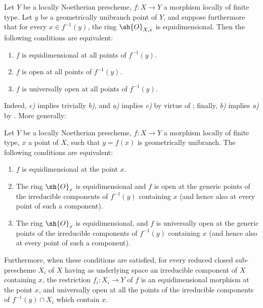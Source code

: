 \begin{corollary}[14.4.6]
\label{IV.14.4.6}
Let $Y$ be a locally Noetherian prescheme, $f:X\to Y$ a morphism locally of finite type.
Let $y$ be a geometrically unibranch point of $Y$, and suppose furthermore that for every $x\in f^{-1}(y)$, the ring $\sh{O}_{X,x}$ is equidimensional.
Then the following conditions are equivalent:
\begin{enumerate}[label=\emph{\alph*)}]
  \item $f$ is equidimensional  at all points of $f^{-1}(y)$.
  \item $f$ is open at all points of $f^{-1}(y)$.
  \item $f$ is universally open at all points of $f^{-1}(y)$.
\end{enumerate}
\end{corollary}

Indeed, \emph{c)} implies trivially \emph{b)}, and \emph{a)} implies \emph{c)} by virtue of ; finally, \emph{b)} implies \emph{a)} by .
More generally:

\begin{proposition}[14.4.7]
\label{IV.14.4.7}
Let $Y$ be a locally Noetherian prescheme, $f:X\to Y$ a morphism locally of finite type, $x$ a point of $X$, such that $y=f(x)$ is geometrically unibranch.
The following conditions are equivalent:
\begin{enumerate}[label=\emph{\alph*)}]
  \item $f$ is equidimensional  at the point $x$.
  \item The ring $\sh{O}_x$ is equidimensional and $f$ is open at the generic points of the irreducible components of $f^{-1}(y)$ containing $x$ (and hence also at every point of such a component).
  \item The ring $\sh{O}_x$ is equidimensional, and $f$ is universally open at the generic points of the irreducible components of $f^{-1}(y)$ containing $x$ (and hence also at every point of such a component).
\end{enumerate}
Furthermore, when these conditions are satisfied, for every reduced closed sub-prescheme $X_i$ of $X$ having as underlying space an irreducible component of $X$ containing $x$, the restriction $f_i:X_i\to Y$ of $f$ is an equidimensional morphism at the point $x$, and universally open at all the points of the irreducible components of $f^{-1}(y)\cap X_i$ which contain $x$.
\end{proposition}

